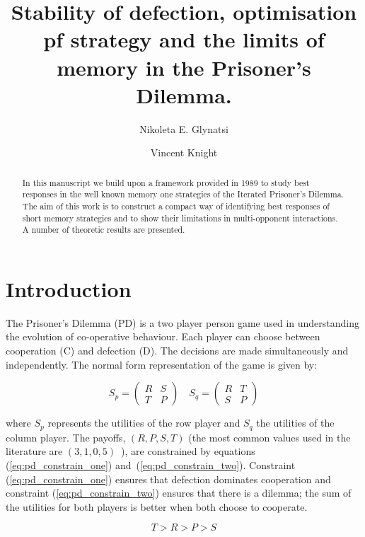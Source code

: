\documentclass[10pt]{article}
\title{Stability of defection, optimisation pf strategy and the limits of memory in
the Prisoner's Dilemma.}
\author{Nikoleta E. Glynatsi \and Vincent Knight}
\date{}
\begin{document}
\maketitle

\begin{abstract}

In this manuscript we build upon a framework provided in 1989 to study best
responses in the well known memory one strategies of the Iterated Prisoner's
Dilemma. The aim of this work is to construct a compact way of identifying best
responses of short memory strategies and to show their limitations in multi-opponent
interactions. A number of theoretic results are presented. %
\end{abstract}

\section{Introduction}\label{section:introduction}

The Prisoner's Dilemma (PD) is a two player person game used in understanding the
evolution of co-operative behaviour. Each player can choose between cooperation
(C) and defection (D). The decisions are made simultaneously and independently.
The normal form representation of the game is given by:

\begin{equation}\label{equ:pd_definition}
    S_p = \begin{pmatrix}
    R & S  \\
    T & P
    \end{pmatrix} \quad
    S_q = \begin{pmatrix}
        R & T  \\
        S & P
        \end{pmatrix}
\end{equation}

where \(S_p\) represents the utilities of the row player and \(S_q\) the utilities
of the column player. The payoffs, \((R, P, S, T)\) (the most common values used in the
literature are \((3, 1, 0, 5)\)~\cite{Axelrod1981}), are constrained by equations
(\ref{eq:pd_constrain_one}) and~(\ref{eq:pd_constrain_two}). Constraint
(\ref{eq:pd_constrain_one}) ensures that defection dominates cooperation and
constraint (\ref{eq:pd_constrain_two}) ensures that there is a dilemma; the sum of the
utilities for both players is better when both choose to cooperate.

\begin{equation}\label{eq:pd_constrain_one}
    T > R > P > S 
\end{equation}
\end{document}
